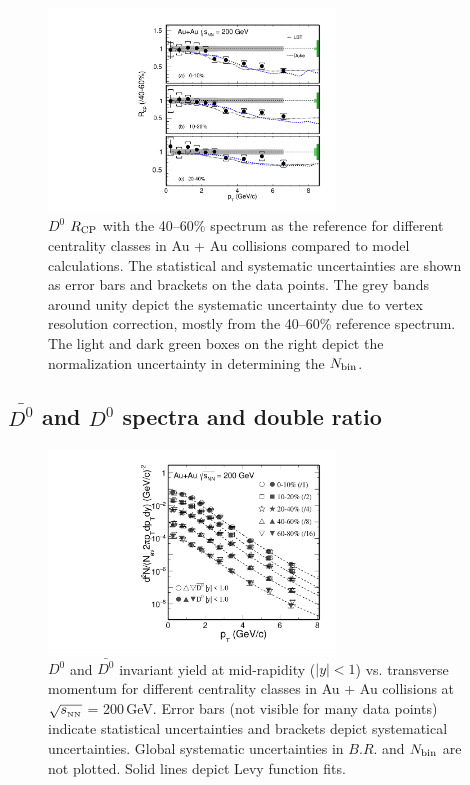 \begin{figure}
\centering
\includegraphics[width=0.68\textwidth]{figure/Run14_D0HFT/D0_Rcp22.pdf}
\caption{$D^{0}$ $R_{\rm CP}$ with the 40--60\% spectrum as the reference for different centrality classes in Au + Au collisions compared to model calculations. The statistical and systematic uncertainties are shown as error bars and brackets on the data points. The grey bands around unity depict the systematic uncertainty due to vertex resolution correction, mostly from the 40--60\% reference spectrum. The light and dark green boxes on the right depict the normalization uncertainty in determining the $N_{\rm bin}$.}
\label{D0_Rcp22} 
\end{figure}

\subsection{\label{D0barD0ratio} $\bar{D^{0}}$ and $D^{0}$ spectra and double ratio}

\begin{figure}
\centering
\includegraphics[width=0.68\textwidth]{figure/Run14_D0HFT/D0_spectra_bothposneg.pdf}
\caption{$D^{0}$ and $\bar{D^{0}}$ invariant yield at mid-rapidity ($|y|<1$) vs. transverse momentum for different centrality classes in Au + Au collisions at $\sqrt{s_{_{\rm NN}}}$ = 200\,GeV. Error bars (not visible for many data points) indicate statistical uncertainties and brackets depict systematical uncertainties. Global systematic uncertainties in $B.R.$ and $N_{\rm bin}$ are not plotted. Solid lines depict Levy function fits.}
\label{D0_spectra_bothposneg} 
\end{figure}

